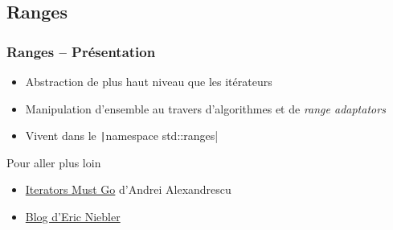 \documentclass[C++.tex]{subfiles}
\begin{document}
\subsection*{Ranges}
\begin{frame}
	\frametitle{Ranges -- Présentation}
	\begin{itemize}
		\item Abstraction de plus haut niveau que les itérateurs
		\item Manipulation d'ensemble au travers d'algorithmes et de \textit{range adaptators}
		\item Vivent dans le \texttt|namespace std::ranges|

	\end{itemize}

	\begin{block}{Pour aller plus loin}
		\begin{itemize}
			\item \href{https://accu.org/content/conf2009/AndreiAlexandrescu_iterators-must-go.pdf}{\og Iterators Must Go\fg{}} d'Andrei Alexandrescu


			\item \href{http://ericniebler.com/}{Blog d'Eric Niebler}
		\end{itemize}
	\end{block}
\end{frame}
\end{document}
